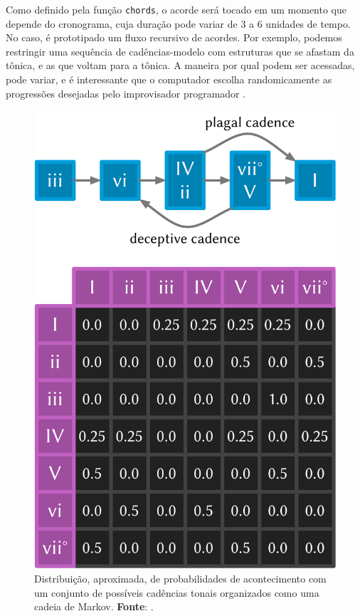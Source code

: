 Como definido pela função \verb|chords|, o acorde será tocado em um momento que depende do cronograma, cuja duração pode variar de 3 a 6 unidades de tempo. No caso, é prototipado um fluxo recursivo de acordes. Por exemplo, podemos restringir uma sequência de cadências-modelo com estruturas que se afastam da tônica, e as que voltam para a tônica. A maneira por qual podem ser acessadas, pode variar, e é interessante que o computador escolha randomicamente as progressões desejadas pelo improvisador programador . 

\begin{figure}
  \centering
  \includegraphics[scale=0.3]{imagens/markov.png}
  \caption{Distribuição, aproximada, de probabilidades de acontecimento com um conjunto de possíveis cadências tonais organizados como uma cadeia de Markov. \textbf{Fonte}: .}
   \label{fig:markov}
\end{figure}

